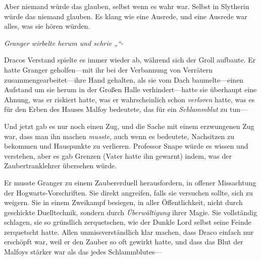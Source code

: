 Aber niemand würde das glauben, selbst wenn es wahr war. Selbst in Slytherin würde das niemand glauben. Es klang wie eine Ausrede, und eine Ausrede war alles, was sie hören würden.

\emph{Granger wirbelte herum und schrie „“}-

Dracos Verstand spielte es immer wieder ab, während sich der Groll aufbaute. Er hatte Granger geholfen—mit ihr bei der Verbannung von Verrätern zusammengearbeitet—ihre Hand gehalten, als sie vom Dach baumelte—einen Aufstand um sie herum in der Großen Halle verhindert—hatte sie überhaupt eine Ahnung, was er riskiert hatte, was er wahrscheinlich schon \emph{verloren} hatte, was es für den Erben des Hauses Malfoy bedeutete, das für ein \emph{Schlammblut} zu tun—

Und jetzt gab es nur noch einen Zug, und die Sache mit einem erzwungenen Zug war, dass man ihn machen \emph{musste}, auch wenn es bedeutete, Nachsitzen zu bekommen und Hauspunkte zu verlieren. Professor Snape würde es wissen und verstehen, aber es gab Grenzen (Vater hatte ihn gewarnt) indem, was der Zaubertranklehrer übersehen würde.

Er musste Granger zu einem Zaubererduell herausfordern, in offener Missachtung der Hogwarts-Vorschriften. Sie direkt angreifen, falls sie versuchen sollte, sich zu weigern. Sie in einem Zweikampf besiegen, in aller Öffentlichkeit, nicht durch geschickte Duelltechnik, sondern durch \emph{Überwältigung} ihrer Magie. Sie vollständig schlagen, sie so gründlich zerquetschen, wie der Dunkle Lord selbst seine Feinde zerquetscht hatte. Allen unmissverständlich klar machen, dass Draco einfach nur erschöpft war, weil er den Zauber so oft gewirkt hatte, und dass das Blut der Malfoys stärker war als das jedes Schlammblutes—


